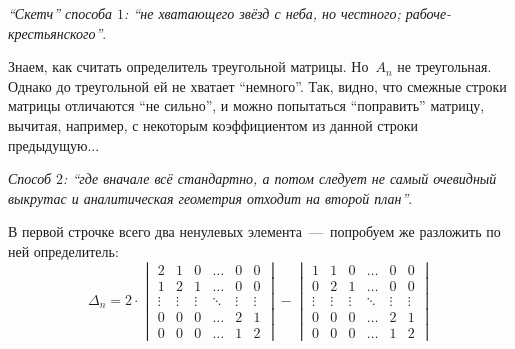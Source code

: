 \documentclass[a4paper,12pt]{article}
\theoremstyle{remark}
\begin{document}
  \begin{solution}
    \leavevmode
    
    \emph{``Скетч'' способа $1$: ``не хватающего звёзд с неба, но честного; рабоче-крестьянского''}.
    
    Знаем, как считать определитель треугольной матрицы.
    Но~$A_n$ не треугольная.
    Однако до треугольной ей не хватает ``немного''.
    Так, видно, что смежные строки матрицы отличаются ``не сильно'', и можно попытаться ``поправить'' матрицу, вычитая, например, с некоторым коэффициентом из данной строки предыдущую...
    
    \medskip
    
    \emph{Способ $2$: ``где вначале всё стандартно, а потом следует не самый очевидный выкрутас и аналитическая геометрия отходит на второй план''}.
    
    В первой строчке всего два ненулевых элемента~---~попробуем же разложить по ней определитель:
    \[
      \Delta_n
      = 2 \cdot \begin{vmatrix}
        2      & 1      & 0      & \ldots & 0      & 0\\
        1      & 2      & 1      & \ldots & 0      & 0\\
        \vdots & \vdots & \vdots & \ddots & \vdots & \vdots\\
        0      & 0      & 0      & \ldots & 2      & 1\\
        0      & 0      & 0      & \ldots & 1      & 2
      \end{vmatrix} - \begin{vmatrix}
        1      & 1      & 0      & \ldots & 0      & 0\\
        0      & 2      & 1      & \ldots & 0      & 0\\
        \vdots & \vdots & \vdots & \ddots & \vdots & \vdots\\
        0      & 0      & 0      & \ldots & 2      & 1\\
        0      & 0      & 0      & \ldots & 1      & 2
      \end{vmatrix}
    \]
    

\end{solution}
\end{document}
